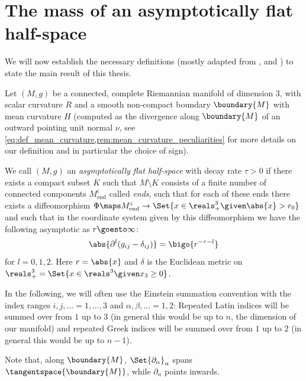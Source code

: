 \documentclass[titlepage,numbers=noenddot,headinclude,oneside,%
footinclude=true,cleardoublepage=empty,%
BCOR=5mm,paper=a4,fontsize=11pt,%
english,%
]{scrartcl}
\begin{document}
\section{The mass of an asymptotically flat half-space}
We will now establish the necessary definitions (mostly adapted from \cite{almarazPositiveMassTheorem2016}, \cite{eichmairDoublingAsymptoticallyFlat2023} and \cite{brayHarmonicFunctionsMass2019}) to state the main result of this thesis.
\begin{definition}\label{def:asymptotically_flat_half_space}
    Let \( (M,g) \) be a connected, complete Riemannian manifold of dimension 3, with scalar curvature \( R \) and a smooth non-compact boundary \( \boundary{M} \) with mean curvature \( H \) (computed as the divergence along \( \boundary{M} \) of an outward pointing unit normal \( \nu \), see \cref{eq:def_mean_curvature,rem:mean_curvature_peculiarities} for more details on our definition and in particular the choice of sign).

    We call \((M,g) \) an \emph{asymptotically flat half-space} with decay rate \( \tau>0 \) if there exists a compact subset \( K \) such that \( M\setminus K \) consists of a finite number of connected components \(M_{\mathrm{end}}^i \) called \emph{ends}, such that for each of these ends there exists a diffeomorphism \( \Phi\maps M_{\mathrm{end}}^i \to \Set{x\in \reals^3_+\given \abs{x}>r_0} \) and such that in the coordinate system given by this diffeomorphism we have the following asymptotic as \( r\goesto \infty \):
    \begin{equation}
        \abs{\partial^l(g_{ij}-\delta_{ij})}=\bigo{r^{-\tau-l}}\label{eq:def_asymptotically_flat}
    \end{equation}
    for \( l=0,1,2 \). Here \( r=\abs{x} \) and \( \delta \) is the Euclidean metric on \( \reals^3_+=\Set{x\in \reals^3\given x_3\geq 0} \). 
\end{definition}
\begin{notation}
    In the following, we will often use the Einstein summation convention with the index ranges \( i,j,\dotsc=1,\dotsc,3\) and \( \alpha,\beta,\dotsc=1,2 \): Repeated Latin indices will be summed over from \( 1  \) up to \( 3 \) (in general this would be up to \( n \), the dimension of our manifold) and repeated Greek indices will be summed over from \( 1 \) up to \( 2 \) (in general this would be up to \( n-1\)).
\end{notation}
Note that, along \( \boundary{M} \), \( \Set{\partial_\alpha}_\alpha \) spans \( \tangentspace{\boundary{M}} \), while \( \partial_n \) points inwards.
\end{document}
